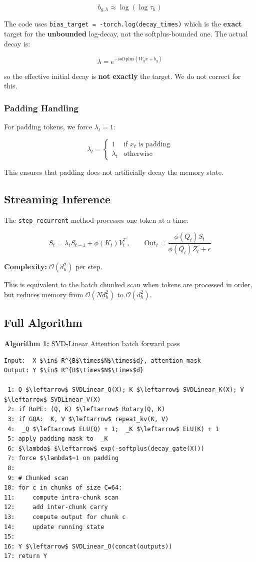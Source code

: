 \[
b_{g, h} \approx \log(\log \tau_h)
\tag{4.14}
\]

The code uses \texttt{bias\_target = -torch.log(decay\_times)} which is the 
\textbf{exact} target for the \textbf{unbounded} log-decay, not the softplus-bounded one. The actual decay is:

\[
\lambda = e^{-\text{softplus}(W_g x + b_g)}
\]

so the effective initial decay is \textbf{not exactly} the target. We do not 
correct for this.

\subsubsection{Padding Handling}

For padding tokens, we force $\lambda_t = 1$:

\[
\lambda_t = \begin{cases} 1 & \text{if } x_t \text{ is padding} \\ \lambda_t & \text{otherwise} \end{cases}
\tag{4.15}
\]

This ensures that padding does not artificially decay the memory state.

\subsection{Streaming Inference}

The \texttt{step\_recurrent} method processes one token at a time:

\[
S_t = \lambda_t S_{t-1} + \phi(K_t) V_t^\top, \qquad
\text{Out}_t = \frac{\phi(Q_t) S_t}{\phi(Q_t) Z_t + \epsilon}
\tag{4.16}
\]

\textbf{Complexity:} $\mathcal{O}(d_h^2)$ per step.

This is equivalent to the batch chunked scan when tokens are processed in 
order, but reduces memory from $\mathcal{O}(N d_h^2)$ to $\mathcal{O}(d_h^2)$.

\subsection{Full Algorithm}

\textbf{Algorithm 1:} SVD-Linear Attention batch forward pass
\begin{lstlisting}
Input:  X $\in$ R^{B$\times$N$\times$d}, attention_mask
Output: Y $\in$ R^{B$\times$N$\times$d}

 1: Q $\leftarrow$ SVDLinear_Q(X); K $\leftarrow$ SVDLinear_K(X); V $\leftarrow$ SVDLinear_V(X)
 2: if RoPE: (Q, K) $\leftarrow$ Rotary(Q, K)
 3: if GQA:  K, V $\leftarrow$ repeat_kv(K, V)
 4:  _Q $\leftarrow$ ELU(Q) + 1;  _K $\leftarrow$ ELU(K) + 1
 5: apply padding mask to  _K
 6: $\lambda$ $\leftarrow$ exp(-softplus(decay_gate(X)))
 7: force $\lambda$=1 on padding
 8:
 9: # Chunked scan
10: for c in chunks of size C=64:
11:     compute intra-chunk scan
12:     add inter-chunk carry
13:     compute output for chunk c
14:     update running state
15:
16: Y $\leftarrow$ SVDLinear_O(concat(outputs))
17: return Y
\end{lstlisting}

